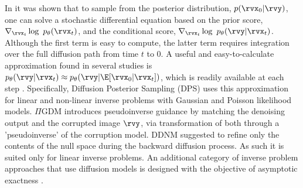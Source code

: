 In \cite{songscore} it was shown that to sample from the posterior distribution, $p(\rvx_0 | \rvy)$, one can solve a stochastic differential equation based on the prior score, $\nabla_{\rvx_t} \log~p_{\theta}(\rvx_t)$, and the conditional score, $\nabla_{\rvx_t} \log~p_{\theta}(\rvy | \rvx_t)$. Although the first term is easy to compute, the latter term requires integration over the full diffusion path from time $t$ to $0$. A useful and easy-to-calculate approximation found in several studies is $p_{\theta}(\rvy | \rvx_t) \approx p_{\theta}(\rvy | \E[\rvx_0 | \rvx_t])$, which is readily available at each step \cite{chungdiffusion, song2023pseudoinverse, wu2024practical}.
Specifically, Diffusion Posterior Sampling (DPS) \cite{chungdiffusion} uses this approximation for linear and non-linear inverse problems with Gaussian and Poisson likelihood models.
$\Pi$GDM \cite{song2023pseudoinverse} introduces pseudoinverse guidance by matching the denoising output and the corrupted image $\rvy$, via transformation of both through a 'pseudoinverse' of the corruption model. %
DDNM \cite{wangzero} suggested to refine only the contents of the null space during the backward diffusion process. As such it is suited only for linear inverse problems. 
An additional category of inverse problem approaches that use diffusion models is designed with the objective of asymptotic exactness \cite{cardoso2023monte, trippe2023diffusion, wu2024practical, dou2024diffusion}. 
